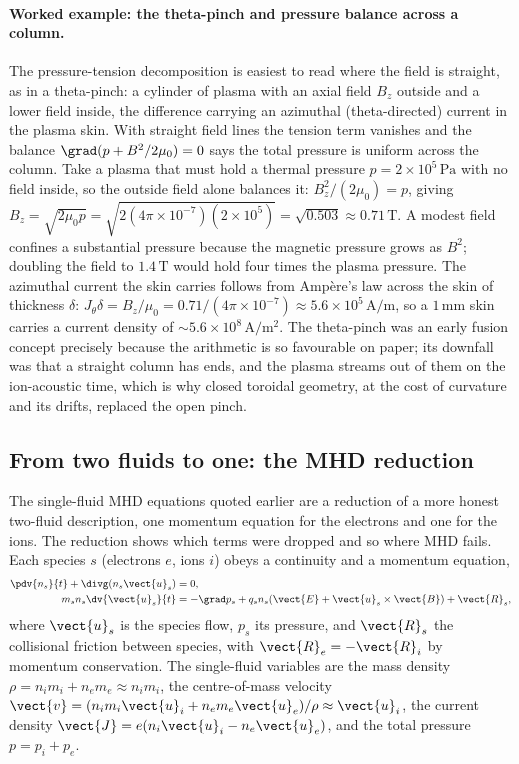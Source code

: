 \paragraph{Worked example: the theta-pinch and pressure balance across a column.}
The pressure-tension decomposition is easiest to read where the field is
straight, as in a theta-pinch: a cylinder of plasma with an axial field $B_z$
outside and a lower field inside, the difference carrying an azimuthal
(theta-directed) current in the plasma skin. With straight field lines the
tension term vanishes and the balance $\grad(p + B^{2}/2\mu_0) = 0$ says the
total pressure is uniform across the column. Take a plasma that must hold a
thermal pressure $p = 2\times 10^{5}\,\si{\pascal}$ with no field inside, so the
outside field alone balances it: $B_z^{2}/(2\mu_0) = p$, giving $B_z =
\sqrt{2\mu_0 p} = \sqrt{2(4\pi\times 10^{-7})(2\times 10^{5})} = \sqrt{0.503}
\approx 0.71\,\si{\tesla}$. A modest field confines a substantial pressure
because the magnetic pressure grows as $B^{2}$; doubling the field to $1.4\,\si{
\tesla}$ would hold four times the plasma pressure. The azimuthal current the
skin carries follows from Amp\`ere's law across the skin of thickness $\delta$:
$J_\theta \delta = B_z/\mu_0 = 0.71/(4\pi\times 10^{-7}) \approx 5.6\times
10^{5}\,\si{\ampere\per\meter}$, so a $1\,\si{\milli\meter}$ skin carries a
current density of $\sim 5.6\times 10^{8}\,\si{\ampere\per\meter\squared}$. The
theta-pinch was an early fusion concept precisely because the arithmetic is so
favourable on paper; its downfall was that a straight column has ends, and the
plasma streams out of them on the ion-acoustic time, which is why closed
toroidal geometry, at the cost of curvature and its drifts, replaced the open
pinch.

\subsection{From two fluids to one: the MHD reduction}

The single-fluid MHD equations quoted earlier are a reduction of a more
honest two-fluid description, one momentum equation for the electrons and
one for the ions. The reduction shows which terms were dropped and so where
MHD fails. Each species $s$ (electrons $e$, ions $i$) obeys a continuity and
a momentum equation,
\begin{align}
\pdv{n_{s}}{t} + \divg(n_{s}\vect{u}_{s}) &= 0,\\
m_{s}n_{s}\dv{\vect{u}_{s}}{t} &= -\grad p_{s}
+ q_{s}n_{s}(\vect{E} + \vect{u}_{s}\times\vect{B})
+ \vect{R}_{s},
\end{align}
where $\vect{u}_{s}$ is the species flow, $p_{s}$ its pressure, and
$\vect{R}_{s}$ the collisional friction between species, with
$\vect{R}_{e} = -\vect{R}_{i}$ by momentum conservation. The single-fluid
variables are the mass density $\rho = n_{i}m_{i} + n_{e}m_{e} \approx
n_{i}m_{i}$, the centre-of-mass velocity $\vect{v} = (n_{i}m_{i}\vect{u}_{i}
+ n_{e}m_{e}\vect{u}_{e})/\rho \approx \vect{u}_{i}$, the current density
$\vect{J} = e(n_{i}\vect{u}_{i} - n_{e}\vect{u}_{e})$, and the total pressure
$p = p_{i} + p_{e}$.


